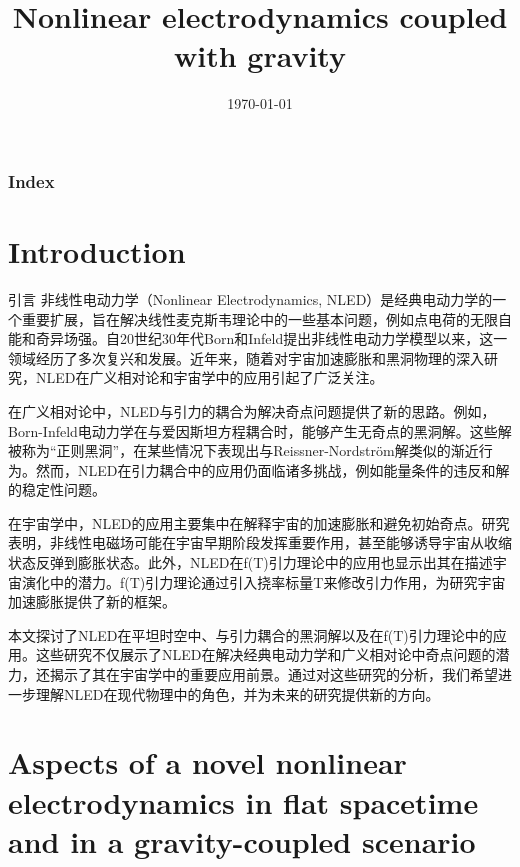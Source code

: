 \documentclass[9pt, dvipsnames]{beamer} %
\title{Nonlinear electrodynamics coupled with gravity } %
\date{\today} %
\begin{document}
\everymath{\displaystyle}

\begin{frame}
    \titlepage %
\end{frame}

\begin{frame}
    \frametitle{\textbf{Index}}
    \begin{multicols}{2}
    \tableofcontents
    \end{multicols}
\end{frame}

\section{Introduction}

\begin{frame}{引言}
    非线性电动力学（Nonlinear Electrodynamics, NLED）是经典电动力学的一个重要扩展，旨在解决线性麦克斯韦理论中的一些基本问题，例如点电荷的无限自能和奇异场强。自20世纪30年代Born和Infeld提出非线性电动力学模型以来，这一领域经历了多次复兴和发展。近年来，随着对宇宙加速膨胀和黑洞物理的深入研究，NLED在广义相对论和宇宙学中的应用引起了广泛关注。

在广义相对论中，NLED与引力的耦合为解决奇点问题提供了新的思路。例如，Born-Infeld电动力学在与爱因斯坦方程耦合时，能够产生无奇点的黑洞解。这些解被称为“正则黑洞”，在某些情况下表现出与Reissner-Nordström解类似的渐近行为。然而，NLED在引力耦合中的应用仍面临诸多挑战，例如能量条件的违反和解的稳定性问题。

在宇宙学中，NLED的应用主要集中在解释宇宙的加速膨胀和避免初始奇点。研究表明，非线性电磁场可能在宇宙早期阶段发挥重要作用，甚至能够诱导宇宙从收缩状态反弹到膨胀状态。此外，NLED在f(T)引力理论中的应用也显示出其在描述宇宙演化中的潜力。f(T)引力理论通过引入挠率标量T来修改引力作用，为研究宇宙加速膨胀提供了新的框架。

本文探讨了NLED在平坦时空中、与引力耦合的黑洞解以及在f(T)引力理论中的应用。这些研究不仅展示了NLED在解决经典电动力学和广义相对论中奇点问题的潜力，还揭示了其在宇宙学中的重要应用前景。通过对这些研究的分析，我们希望进一步理解NLED在现代物理中的角色，并为未来的研究提供新的方向。
\end{frame}

\section{Aspects of a novel nonlinear electrodynamics in flat spacetime and in a gravity-coupled scenario}
\end{document}
